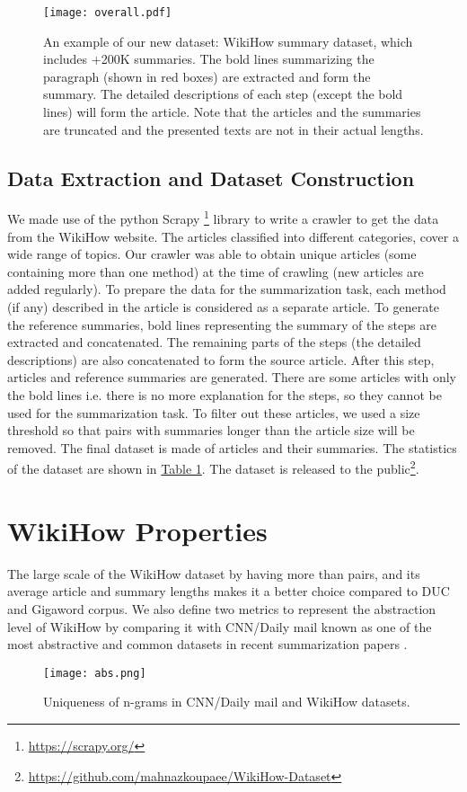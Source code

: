 \documentclass[11pt,a4paper]{article}
\begin{document}
\begin{figure*}[t]
  \centering    
  \texttt{[image: overall.pdf]}
\caption{An example of our new dataset: WikiHow summary dataset, which includes +200K summaries. The bold lines summarizing the paragraph (shown in red boxes) are extracted and form the summary. The detailed descriptions of each step (except the bold lines) will form the article. Note that the articles and the summaries are truncated and the presented texts are not in their actual lengths.}
  \label{fig:wikihow}
\end{figure*}


\subsection{Data Extraction and Dataset Construction}
We made use of the python Scrapy \footnote{\url{https://scrapy.org/}} library to write a crawler to get the data from the WikiHow website. The articles classified into  different categories, cover a wide range of topics. Our crawler was able to obtain  unique articles (some containing more than one method) at the time of crawling (new articles are added regularly). 
To prepare the data for the summarization task, each method (if any) described in the article is considered as a separate article. To generate the reference summaries, bold lines representing the summary of the steps are extracted and concatenated. The remaining parts of the steps (the detailed descriptions) are also concatenated to form the source article. After this step,  articles and reference summaries are generated. 
There are some articles with only the bold lines i.e. there is no more explanation for the steps, so they cannot be used for the summarization task. To filter out these articles, we used a size threshold so that pairs with summaries longer than the article size will be removed. The final dataset is made of  articles and their summaries. 
The statistics of the dataset are shown in \hyperref[tbl:1]{Table 1}. The dataset is released to the public\footnote{\url{https://github.com/mahnazkoupaee/WikiHow-Dataset}}.

\section{WikiHow Properties}
The large scale of the WikiHow dataset by having more than  pairs, and its average article and summary lengths makes it a better choice compared to DUC and Gigaword corpus.
We also define two metrics to represent the abstraction level of WikiHow by comparing it with CNN/Daily mail known as one of the most abstractive and common datasets in recent summarization papers \cite{nallapati2016abstractive,nallapati2017summarunner,see2017get,paulus2017deep}.
\begin{figure}
  \centering    
  \texttt{[image: abs.png]}
\caption{Uniqueness of n-grams in CNN/Daily mail and WikiHow datasets.}
  \label{fig:abstract}
  \vspace*{-2mm}
\end{figure}
\end{document}
